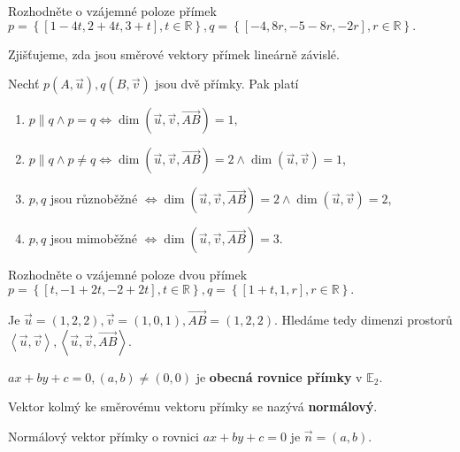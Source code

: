 \begin{priklad}
Rozhodněte o vzájemné poloze přímek $p=\left \{ [1-4t,2+4t,3+t], t \in \mathbb R \right \},q=\left \{ [-4,8r,-5-8r,-2r],r \in \mathbb R \right \} . $
\end{priklad}

\begin{reseni}
Zjišťujeme, zda jsou směrové vektory přímek lineárně závislé.
\end{reseni}

\begin{veta}
    Nechť $p(A,\vec u), q(B, \vec v)$ jsou dvě přímky. Pak platí
    \begin{enumerate}[$i.$]
    \item $p\parallel q \land p=q \iff \dim(\vec u, \vec v, \overrightarrow{AB})=1,$
   	\item $p\parallel q \land p\ne q \iff \dim(\vec u, \vec v, \overrightarrow{AB})=2 \land \dim ( \vec u, \vec v) = 1$,
    \item $p, q$ jsou různoběžné $ \iff \dim(\vec u, \vec v, \overrightarrow{AB})=2 \land \dim ( \vec u, \vec v) = 2$,
    \item $p, q$ jsou mimoběžné $\iff \dim(\vec u, \vec v, \overrightarrow{AB})=3.$
    \end{enumerate}
\end{veta}

\begin{priklad}
Rozhodněte o vzájemné poloze dvou přímek $p=\left \{ [t,-1+2t,-2+2t], t \in \mathbb R \right \}, q=\left \{ [1+t,1,r], r \in \mathbb R \right \}.  $
\end{priklad}

\begin{reseni}
Je $\vec u = (1,2,2), \vec v = (1,0,1), \overrightarrow{AB}=(1,2,2).$ Hledáme tedy
dimenzi prostorů $\left < \vec u, \vec v \right >, \left < \vec u, \vec v, \overrightarrow{AB} \right >.  $
\end{reseni}

\begin{definition}
    $ax+by+c=0, (a,b)\ne(0,0)$ je \textbf{obecná rovnice přímky} v $\mathbb E_2$.
\end{definition}

\begin{definition}
    Vektor kolmý ke směrovému vektoru přímky se nazývá \textbf{normálový}.
\end{definition}

\begin{veta}
    Normálový vektor přímky o rovnici $ax+by+c=0$ je $\vec n=(a,b)$.
\end{veta}

